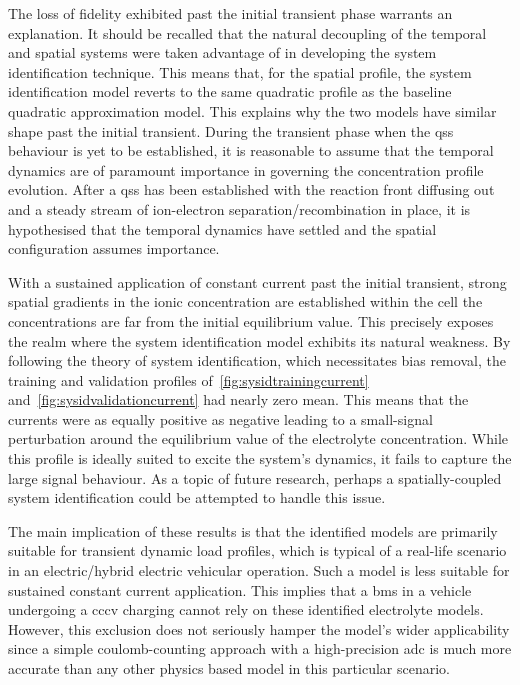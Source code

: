The  loss  of fidelity  exhibited  past  the  initial transient  phase  warrants
an  explanation. It  should  be  recalled that  the  natural  decoupling of  the
temporal and  spatial systems were taken  advantage of in developing  the system
identification technique. This  means that, for the spatial  profile, the system
identification  model reverts  to the  same  quadratic profile  as the  baseline
quadratic approximation  model. This  explains why the  two models  have similar
shape past the initial transient. During  the transient phase when the \gls{qss}
behaviour is yet to be established, it is reasonable to assume that the temporal
dynamics  are of  paramount importance  in governing  the concentration  profile
evolution.  After a  \gls{qss}  has  been established  with  the reaction  front
diffusing out  and a steady  stream of ion-electron  separation/recombination in
place,  it is  hypothesised  that the  temporal dynamics  have  settled and  the
spatial configuration assumes importance.

With a  sustained application  of constant current  past the  initial transient,
strong spatial gradients  in the ionic concentration are  established within the
cell \ie{} the  concentrations are far from the initial  equilibrium value. This
precisely  exposes the  realm  where the  system  identification model  exhibits
its  natural  weakness.  By  following  the  theory  of  system  identification,
which  necessitates   bias  removal,   the  training  and   validation  profiles
of~\cref{fig:sysidtrainingcurrent}   and~\cref{fig:sysidvalidationcurrent}   had
nearly  zero mean.  This means  that the  currents were  as equally  positive as
negative leading to a small-signal  perturbation around the equilibrium value of
the electrolyte  concentration. While this  profile is ideally suited  to excite
the system's  dynamics, it  fails to  capture the large  signal behaviour.  As a
topic  of future  research,  perhaps a  spatially-coupled system  identification
could be attempted to handle this issue.

The  main  implication of  these  results  is  that  the identified  models  are
primarily suitable for  transient \ie{} dynamic load profiles,  which is typical
of a real-life scenario in an electric/hybrid electric vehicular operation. Such
a  model is  less  suitable  for sustained  constant  current application.  This
implies that  a \gls{bms} in a  vehicle undergoing a \gls{cccv}  charging cannot
rely on  these identified electrolyte  models. However, this exclusion  does not
seriously hamper the model's wider applicability since a simple coulomb-counting
approach with  a high-precision \gls{adc} is  much more accurate than  any other
physics based model in this particular scenario.

